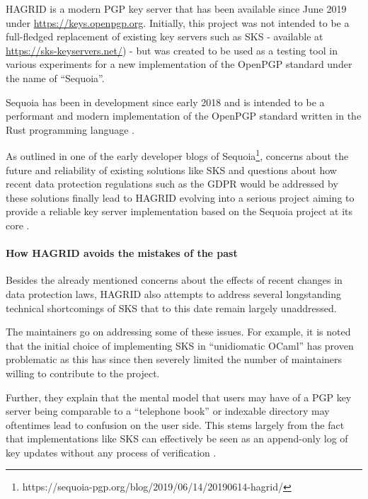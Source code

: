

HAGRID is a modern PGP key server that has been available since June 2019 under \url{https://keys.openpgp.org}. 
Initially, this project was not intended to be a full-fledged replacement of existing key servers such as SKS - available at \url{https://sks-keyservers.net/}) - but was created to be used as a testing tool in various experiments for a new implementation of the OpenPGP standard under the name of ``Sequoia''.

Sequoia has been in development since early 2018 and is intended to be a performant and modern implementation of the OpenPGP standard written in the Rust programming language \cite{sequoia_blog}.

As outlined in one of the early developer blogs of Sequoia\footnote[1]{\label{footnote}https://sequoia-pgp.org/blog/2019/06/14/20190614-hagrid/}, concerns about the future and reliability of existing solutions like SKS and questions about how recent data protection regulations such as the GDPR would be addressed by these solutions finally lead to HAGRID evolving into a serious project aiming to provide a reliable key server implementation based on the Sequoia project at its core \cite{sequoia_blog}.


\paragraph{How HAGRID avoids the mistakes of the past}
\label{sec:hagrid_solves}
Besides the already mentioned concerns about the effects of recent changes in data protection laws, HAGRID also attempts to address several longstanding technical shortcomings of SKS that to this date remain largely unaddressed.

The maintainers go on addressing some of these issues. For example, it is noted that the initial choice of implementing SKS in ``unidiomatic OCaml'' has proven problematic as this has since then severely limited the number of maintainers willing to contribute to the project.

Further, they explain that the mental model that users may have of a PGP key server being comparable to a ``telephone book'' or indexable directory may oftentimes lead to confusion on the user side. This stems largely from the fact that implementations like SKS can effectively be seen as an append-only log of key updates without any process of verification \cite{sequoia_blog}.  


